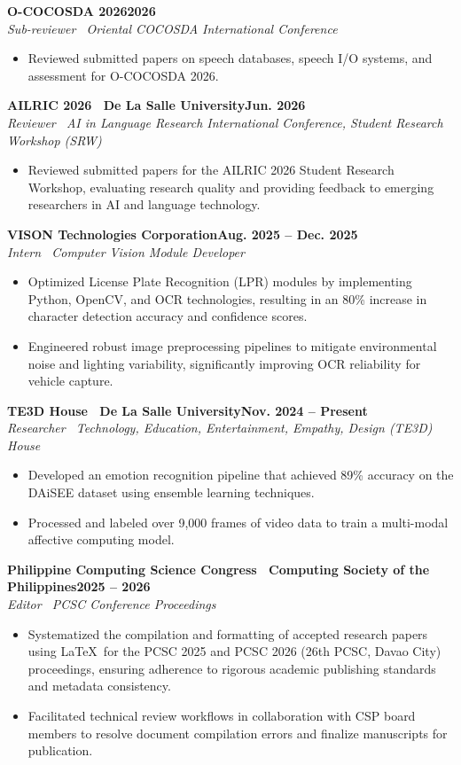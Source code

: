 \documentclass[10.5pt, letterpaper]{article}
\newcommand{\entry}[3]{%
    \par\noindent
    {\textbf{#1}\hfill\textbf{#2}}\\
    {\textit{#3}}\par\vspace{0.05em}
}
\begin{document}
\entry{O-COCOSDA 2026}{2026}{Sub-reviewer \textbar\ Oriental COCOSDA International Conference}
\begin{itemize}
    \item Reviewed submitted papers on speech databases, speech I/O systems, and assessment for O-COCOSDA 2026.
\end{itemize}

\entry{AILRIC 2026 \textbar\ De La Salle University}{Jun. 2026}{Reviewer \textbar\ AI in Language Research International Conference, Student Research Workshop (SRW)}
\begin{itemize}
    \item Reviewed submitted papers for the AILRIC 2026 Student Research Workshop, evaluating research quality and providing feedback to emerging researchers in AI and language technology.
\end{itemize}

\entry{VISON Technologies Corporation}{Aug. 2025 -- Dec. 2025}{Intern \textbar\ Computer Vision Module Developer}
\begin{itemize}
    \item Optimized License Plate Recognition (LPR) modules by implementing Python, OpenCV, and OCR technologies, resulting in an 80\% increase in character detection accuracy and confidence scores.
    \item Engineered robust image preprocessing pipelines to mitigate environmental noise and lighting variability, significantly improving OCR reliability for vehicle capture.
\end{itemize}

\entry{TE3D House \textbar\ De La Salle University}{Nov. 2024 -- Present}{Researcher \textbar\ Technology, Education, Entertainment, Empathy, Design (TE3D) House}
\begin{itemize}
    \item Developed an emotion recognition pipeline that achieved 89\% accuracy on the DAiSEE dataset using ensemble learning techniques.
    \item Processed and labeled over 9,000 frames of video data to train a multi-modal affective computing model.
\end{itemize}

\entry{Philippine Computing Science Congress \textbar\ Computing Society of the Philippines}{2025 -- 2026}{Editor \textbar\ PCSC Conference Proceedings}
\begin{itemize}
    \item Systematized the compilation and formatting of accepted research papers using \LaTeX\ for the PCSC 2025 and PCSC 2026 (26th PCSC, Davao City) proceedings, ensuring adherence to rigorous academic publishing standards and metadata consistency.
    \item Facilitated technical review workflows in collaboration with CSP board members to resolve document compilation errors and finalize manuscripts for publication.
\end{itemize}
\end{document}
